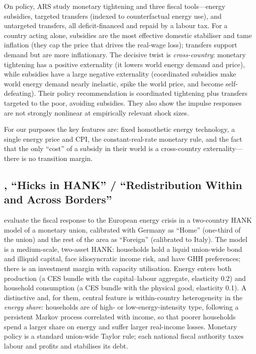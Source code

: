 \documentclass[11pt,a4paper]{article}
\begin{document}
On policy, ARS study monetary tightening and three fiscal tools---energy
subsidies, targeted transfers (indexed to counterfactual energy use), and
untargeted transfers, all deficit-financed and repaid by a labour tax. For a
country acting alone, subsidies are the most effective domestic stabiliser and
tame inflation (they cap the price that drives the real-wage loss); transfers
support demand but are more inflationary. The decisive twist is
\emph{cross-country}: monetary tightening has a positive externality (it lowers
world energy demand and price), while subsidies have a large negative
externality (coordinated subsidies make world energy demand nearly inelastic,
spike the world price, and become self-defeating). Their policy recommendation
is coordinated tightening plus transfers targeted to the poor, avoiding
subsidies. They also show the impulse responses are not strongly nonlinear at
empirically relevant shock sizes.

For our purposes the key features are: fixed homothetic energy technology, a
single energy price and CPI, the constant-real-rate monetary rule, and the fact
that the only ``cost'' of a subsidy in their world is a cross-country
externality---there is no transition margin.

\subsection{\citet{Bayer2026}, ``Hicks in HANK'' / ``Redistribution Within and
Across Borders''}

\citet{Bayer2026} evaluate the fiscal response to the European energy crisis in
a two-country HANK model of a monetary union, calibrated with Germany as
``Home'' (one-third of the union) and the rest of the area as ``Foreign''
(calibrated to Italy). The model is a medium-scale, two-asset HANK: households
hold a liquid union-wide bond and illiquid capital, face idiosyncratic income
risk, and have GHH preferences; there is an investment margin with capacity
utilisation. Energy enters both production (a CES bundle with the
capital--labour aggregate, elasticity 0.2) and household consumption (a CES
bundle with the physical good, elasticity 0.1). A distinctive and, for them,
central feature is within-country heterogeneity in the \emph{energy share}:
households are of high- or low-energy-intensity type, following a persistent
Markov process correlated with income, so that poorer households spend a larger
share on energy and suffer larger real-income losses. Monetary policy is a
standard union-wide Taylor rule; each national fiscal authority taxes labour
and profits and stabilises its debt.
\end{document}
